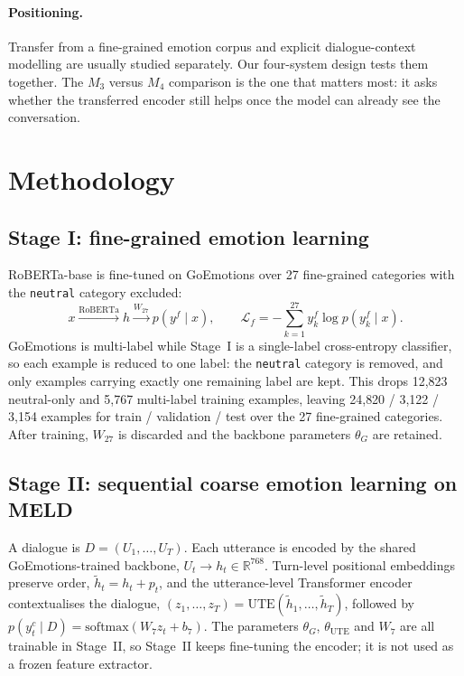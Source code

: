 \documentclass[sigconf,nonacm]{acmart}
\begin{document}
\paragraph{Positioning.}
Transfer from a fine-grained emotion corpus and explicit dialogue-context modelling are
usually studied separately. Our four-system design tests them together. The $M_3$ versus
$M_4$ comparison is the one that matters most: it asks whether the transferred encoder
still helps once the model can already see the conversation.

\section{Methodology}

\subsection{Stage I: fine-grained emotion learning}
RoBERTa-base is fine-tuned on GoEmotions over 27 fine-grained categories with the
\texttt{neutral} category excluded:
\[
x \xrightarrow{\text{RoBERTa}} h \xrightarrow{W_{27}} p(y^f \mid x),
\qquad
\mathcal{L}_f = -\sum_{k=1}^{27} y^f_k \log p(y^f_k \mid x).
\]
GoEmotions is multi-label while Stage~I is a single-label cross-entropy classifier, so
each example is reduced to one label: the \texttt{neutral} category is removed, and only
examples carrying exactly one remaining label are kept. This drops 12{,}823 neutral-only
and 5{,}767 multi-label training examples, leaving 24{,}820 / 3{,}122 / 3{,}154 examples
for train / validation / test over the 27 fine-grained categories. After training,
$W_{27}$ is discarded and the backbone parameters $\theta_G$ are retained.

\subsection{Stage II: sequential coarse emotion learning on MELD}
A dialogue is $D = (U_1, \dots, U_T)$. Each utterance is encoded by the shared
GoEmotions-trained backbone, $U_t \rightarrow h_t \in \mathbb{R}^{768}$. Turn-level
positional embeddings preserve order, $\widetilde{h}_t = h_t + p_t$, and the
utterance-level Transformer encoder contextualises the dialogue,
$(z_1, \dots, z_T) = \mathrm{UTE}(\widetilde{h}_1, \dots, \widetilde{h}_T)$, followed by
$p(y^c_t \mid D) = \mathrm{softmax}(W_7 z_t + b_7)$. The parameters
$\theta_G$, $\theta_{\mathrm{UTE}}$ and $W_7$ are all trainable in Stage~II, so Stage~II
keeps fine-tuning the encoder; it is not used as a frozen feature extractor.
\end{document}

